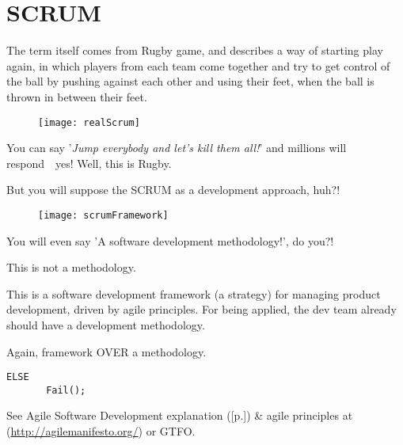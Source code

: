 \section{SCRUM}
\label{sec:SCRUM}

The term itself comes from Rugby game, and describes a way of starting play again, in which players from each team come together and try to get control of the ball by pushing against each other and using their feet, when the ball is thrown in between their feet. 

\begin{figure}[!h]
\centering
\texttt{[image: realScrum]}
\caption{}
\label{fig:realScrum}
\end{figure}

You can say '\textit{Jump everybody and let's kill them all!}' and millions will respond~\textemdash~yes! Well, this is Rugby.

But you will suppose the SCRUM as a development approach, huh?!

\begin{figure}[!h]
\centering
\texttt{[image: scrumFramework]}
\caption{}
\label{fig:scrumFramework}
\end{figure}

You will even say 'A software development methodology!', do you?!

This is not a methodology. 

This is a software development framework (a strategy) for managing product development, driven by agile principles. For being applied, the dev team already should have a development methodology.

Again, framework OVER a methodology.

\begin{verbatim}
ELSE
       Fail();
\end{verbatim}

See  Agile Software Development explanation ([p.\pageref{sec:Agile Software Development}]) \& agile principles at (\url{http://agilemanifesto.org/}) or GTFO.
